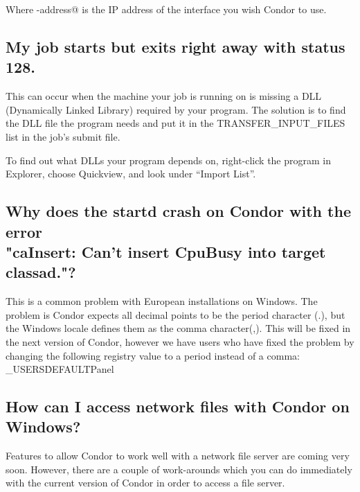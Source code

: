 Where \verb@ip-address@ is the IP address of the interface you wish
Condor to use.

\subsection*{My job starts but exits right away with status 128.}

This can occur when the machine your job is running on is missing a
DLL (Dynamically Linked Library) required by your program.
The solution is to find the DLL file the program needs and put it in
the TRANSFER\_INPUT\_FILES list in the job's submit file.

To find out what DLLs your program depends on, right-click the program
in Explorer, choose Quickview, and look under ``Import List''.


\subsection*{Why does the startd crash on Condor with the error\\
"caInsert: Can't insert CpuBusy into target classad."?}

This is a common problem with European installations on Windows.
The problem is Condor expects all decimal points to be the
period character (.),
but the Windows locale defines them as the comma character(,).
This will be fixed in the next version of Condor,
however we have users who have fixed the problem by 
changing the following registry value to a period instead of a comma:
\verb@HKEY_USERS\.DEFAULT\Control Panel\International\sDecimal@

\subsection*{How can I access network files with Condor on Windows?}

Features to allow Condor to work well with a network file server are 
coming very soon.  However, there are a couple of work-arounds which you 
can do immediately with the current version of Condor in order to access 
a file server.

